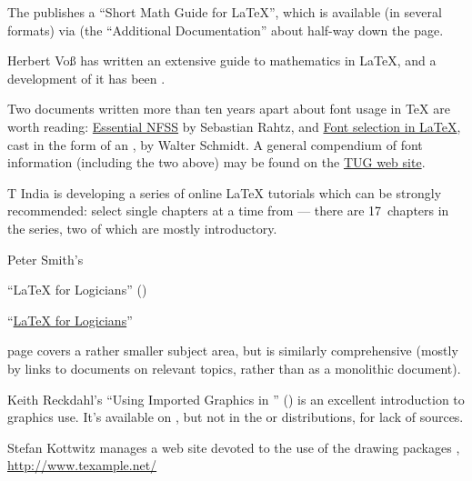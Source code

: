 
The  publishes a ``Short Math Guide for \LaTeX{}'', which is
available (in several formats) via
 (the ``Additional
Documentation'' about half-way down the page.

Herbert Vo\ss {} has written an extensive guide to mathematics in
\LaTeX{}, and a development of it has been %
.

Two documents written more than ten years apart about font usage in
\TeX{} are worth reading: %
\href{http://www.tug.org/TUGboat/Articles/tb14-2/tb39rahtz-nfss.pdf}{Essential NFSS}
by Sebastian Rahtz, and %
\href{http://tug.org/pracjourn/2006-1/schmidt/schmidt.pdf}{Font selection in LaTeX},
cast in the form of an , by Walter Schmidt.  A general
compendium of font information (including the two above) may be found
on the \href{http://www.tug.org/fonts/}{TUG web site}.

T India is developing a series of online \LaTeX{} tutorials
which can be strongly recommended: select single chapters at a time
from \nobreakspace--- there
are 17~chapters in the series, two of which are mostly introductory.

Peter Smith's
\begin{narrowversion}
  ``\LaTeX{} for Logicians''
  ()
\end{narrowversion}
\begin{wideversion}
  ``\href{http://www.logicmatters.net/latex-for-logicians/}{\LaTeX{} for Logicians}''
\end{wideversion}
page covers a rather smaller subject area, but is similarly comprehensive
(mostly by links to documents on relevant topics, rather than as a
monolithic document).

Keith Reckdahl's ``Using Imported Graphics in \LaTeXe{}''
() is an
excellent introduction to graphics use.  It's available on
, but not in the \texlive{} or \miktex{} distributions, for
lack of sources.

Stefan Kottwitz manages a web site devoted to the use of the drawing
packages %
, %
\url{http://www.texample.net/}

